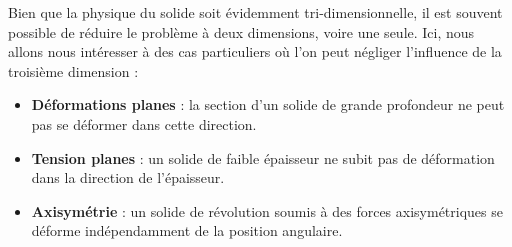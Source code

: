\documentclass[12pt]{article}
\begin{document}
Bien que la physique du solide soit évidemment tri-dimensionnelle, il est 
souvent possible de réduire le problème à deux dimensions, voire une seule. Ici,
nous allons nous intéresser à des cas particuliers où l'on peut négliger
l'influence de la troisième dimension :
\begin{itemize}
    \item \textbf{Déformations planes} : la section d'un solide de grande 
    profondeur ne peut pas se déformer dans cette direction.
    \item \textbf{Tension planes} : un solide de faible épaisseur ne subit pas 
    de déformation dans la direction de l'épaisseur.
    \item \textbf{Axisymétrie} : un solide de révolution soumis à des forces
    axisymétriques se déforme indépendamment de la position angulaire.
\end{itemize}
\end{document}
